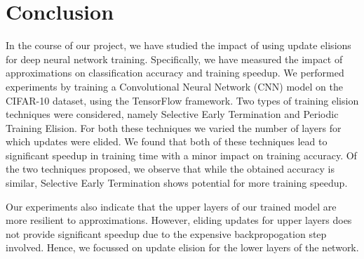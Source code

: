 \section{Conclusion}
In the course of our project, we have studied the impact of using update elisions for deep neural network training. Specifically, we have measured the impact of approximations on classification accuracy and training speedup. We performed experiments by training a Convolutional Neural Network (CNN) model on the CIFAR-10 dataset, using the TensorFlow framework. Two types of training elision techniques were considered, namely Selective Early Termination and Periodic Training Elision. For both these techniques we varied the number of layers for which updates were elided. We found that both of these techniques lead to significant speedup in training time with a minor impact on training accuracy.  Of the two techniques proposed, we observe that while the obtained accuracy is similar, Selective Early Termination shows potential for more training speedup.

Our experiments also indicate that the upper layers of our trained model are more resilient to approximations. However, eliding updates for upper layers does not provide significant speedup due to the expensive backpropogation step involved. Hence, we focussed on update elision for the lower layers of the network.